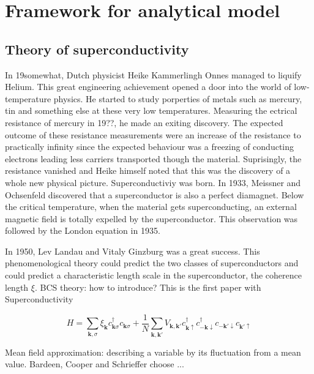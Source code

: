 \chapter{Framework for analytical model}
\label{ch:basics}

\section{Theory of superconductivity}

In 19somewhat, Dutch physicist Heike Kammerlingh Onnes managed to liquify Helium. This great engineering achievement opened a door into the world of low-temperature physics. He started to study porperties of metals such as mercury, tin and something else at these very low temperatures. Measuring the ectrical resistance of mercury in 19??, he made an exiting discovery. The expected outcome of these resistance measurements were an increase of the resistance to practically infinity since the expected behaviour was a freezing of conducting electrons leading less carriers transported though the material. Suprisingly, the resistance vanished and Heike himself noted that this was the discovery of a whole new physical picture. Superconductiviy was born. In 1933, Meissner and Ochsenfeld discovered that a superconductor is also a perfect diamagnet. Below the critical temperature, when the material gets superconducting, an external magnetic field is totally expelled by the superconductor. This observation was followed by the London equation in 1935.

In 1950, Lev Landau and Vitaly Ginzburg was a great success. This phenomenological theory could predict the two classes of superconductors and could predict a characteristic length scale in the superconductor, the coherence length $\xi$. 
BCS theory: how to introduce? This is the first paper with Superconductivity \cite{Bardeen1957}

\begin{equation}
H = \sum_{\mathbf{k}, \sigma} \xi_{\mathbf{k}} c^{\dagger}_{\mathbf{k} \sigma }c_{\mathbf{k} \sigma }  + \frac{1}{N} \sum_{\mathbf{k}, \mathbf{k'}} V_\mathbf{{\mathbf{k}, \mathbf{k'}}} c^{\dagger}_{\mathbf{k} \uparrow }c^{\dagger}_{- \mathbf{k} \downarrow}   c_{- \mathbf{k'} \downarrow} c_{\mathbf{k'} \uparrow}  
\end{equation}

Mean field approximation: describing a variable by its fluctuation from a mean value. Bardeen, Cooper and Schrieffer choose ...

